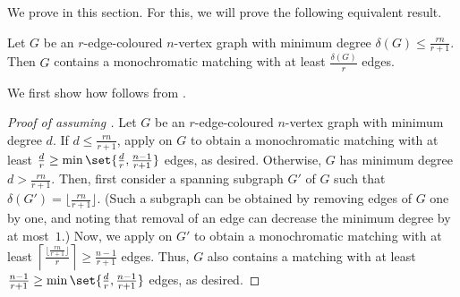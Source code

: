 \documentclass[10pt,a4paper,reqno]{amsart}
\begin{document}
We prove  in this section. For this, we will prove the following equivalent result.
\begin{theorem}
  \label{thm:large monochromatic matching}
  Let $G$ be an $r$-edge-coloured $n$-vertex graph with minimum degree $\delta(G) \leq \frac{rn}{r + 1}$. Then $G$ contains a monochromatic matching with at least $\frac{\delta(G)}{r}$ edges.
\end{theorem}
We first show how  follows from .
\begin{proof}[Proof of  assuming ]
Let $G$ be an $r$-edge-coloured $n$-vertex graph with minimum degree $d$. If $d\le \frac{rn}{r+1}$, apply  on $G$ to obtain a monochromatic matching with at least $\frac{d}{r}\ge \min\set{\frac{d}{r},\frac{n-1}{r+1}}$ edges, as desired. Otherwise, $G$ has minimum degree $d > \frac{rn}{r+1}$. Then, first consider a spanning subgraph $G'$ of $G$ such that $\delta(G')=\lfloor\frac{rn}{r+1}\rfloor$. (Such a subgraph can be obtained by removing edges of $G$ one by one, and noting that removal of an edge can decrease the minimum degree by at most~$1$.) Now, we apply  on $G'$ to obtain a monochromatic matching with at least $\left\lceil\frac{\lfloor\frac{rn}{r+1}\rfloor}{r}\right\rceil \ge \frac{n-1}{r+1}$ edges. Thus, $G$ also contains a matching with at least $\frac{n-1}{r+1}\ge \min\set{\frac{d}{r},\frac{n-1}{r+1}}$ edges, as desired.
\end{proof}
\end{document}
